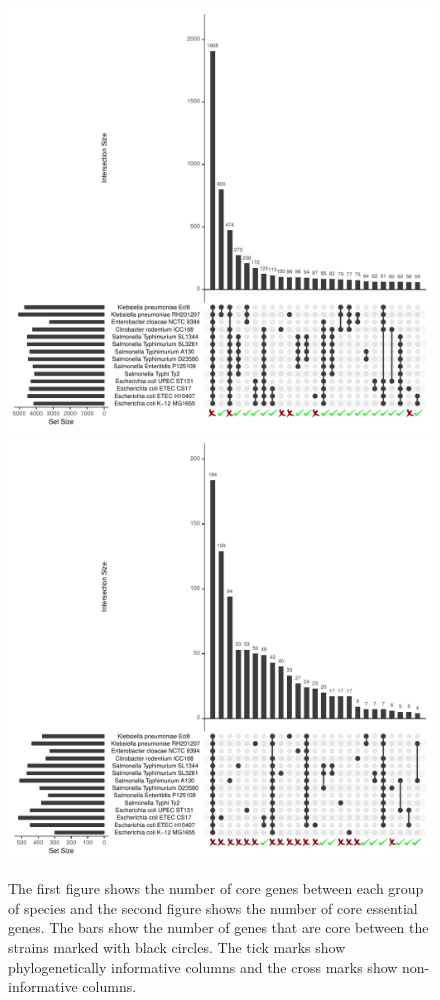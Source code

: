 \documentclass[12pt,letterpaper]{article}
\begin{document}
\begin{figure}
\centering
\includegraphics[scale=0.6]{upsetr1-edited.pdf}\\
\includegraphics[scale=0.6]{upsetr2-edited.pdf}
\caption{The first figure shows the number of core genes between each group of species and the second figure shows the number of core essential genes. The bars show the number of genes that are core between the strains marked with black circles. The tick marks show phylogenetically informative columns and the cross marks show non-informative columns.}
\label{fig:upsetr}
\end{figure}
\end{document}

